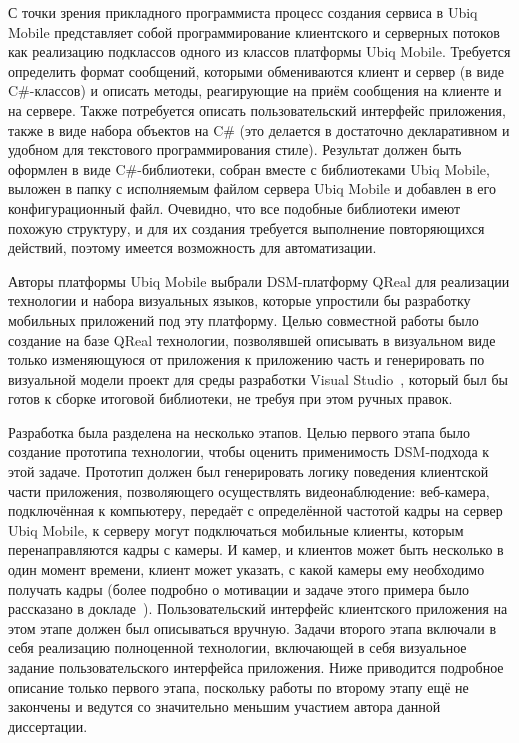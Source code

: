 С точки зрения прикладного программиста процесс создания сервиса в Ubiq Mobile представляет 
собой программирование клиентского и серверных потоков как реализацию подклассов одного 
из классов платформы Ubiq Mobile. Требуется определить формат сообщений, которыми 
обмениваются клиент и сервер (в виде C\#-классов) и описать методы, реагирующие на 
приём сообщения на клиенте и на сервере. Также потребуется описать пользовательский 
интерфейс приложения, также в виде набора объектов на C\# (это делается в достаточно 
декларативном и удобном для текстового программирования стиле). Результат должен быть 
оформлен в виде C\#-библиотеки, собран вместе с библиотеками Ubiq Mobile, выложен в 
папку с исполняемым файлом сервера Ubiq Mobile и добавлен в его конфигурационный файл. 
Очевидно, что все подобные библиотеки имеют похожую структуру, и для их создания требуется 
выполнение повторяющихся действий, поэтому имеется возможность для автоматизации.

Авторы платформы Ubiq Mobile выбрали \ac{DSM}-платформу QReal для реализации технологии 
и набора визуальных языков, которые упростили бы разработку мобильных приложений под 
эту платформу. Целью совместной работы было создание на базе QReal технологии, позволявшей 
описывать в визуальном виде только изменяющуюся от приложения к приложению часть и 
генерировать по визуальной модели проект для среды разработки Visual Studio~\cite{visualStudio}, 
который был бы готов к сборке итоговой библиотеки, не требуя при этом ручных правок. 

Разработка была разделена на несколько этапов. Целью первого этапа было создание прототипа 
технологии, чтобы оценить применимость \ac{DSM}-подхода к этой задаче. Прототип должен 
был генерировать логику поведения клиентской части приложения, позволяющего осуществлять 
видеонаблюдение: веб-камера, подключённая к компьютеру, передаёт с определённой частотой 
кадры на сервер Ubiq Mobile, к серверу могут подключаться мобильные клиенты, которым 
перенаправляются кадры с камеры. И камер, и клиентов может быть несколько в один момент 
времени, клиент может указать, с какой камеры ему необходимо получать кадры 
(более подробно о мотивации и задаче этого примера было рассказано в докладе~\cite{terekhov2011ubiq}).
Пользовательский интерфейс клиентского приложения на этом этапе должен был описываться 
вручную. Задачи второго этапа включали в себя реализацию полноценной технологии, включающей 
в себя визуальное задание пользовательского интерфейса приложения. Ниже приводится 
подробное описание только первого этапа, поскольку работы по второму этапу ещё не 
закончены и ведутся со значительно меньшим участием автора данной диссертации.

